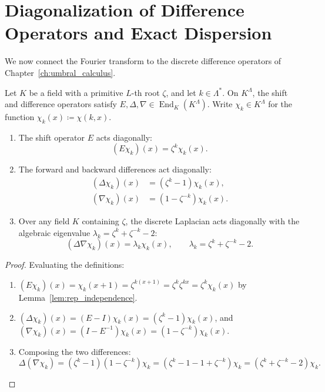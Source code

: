 \section{Diagonalization of Difference Operators and Exact Dispersion}

We now connect the Fourier transform to the discrete difference operators of Chapter~\ref{ch:umbral_calculus}.

\begin{theorem}
\label{thm:diagonal_dispersion}
Let $K$ be a field with a primitive $L$-th root $\zeta$, and let $k\in\Lambda^*$. On $K^\Lambda$, the shift and difference operators satisfy $E,\Delta,\nabla\in\operatorname{End}_K(K^\Lambda)$. Write $\chi_k\in K^\Lambda$ for the function $\chi_k(x)\coloneqq\chi(k,x)$.
\begin{enumerate}
    \item The shift operator $E$ acts diagonally:
    \begin{equation}
    (E \chi_k)(x) = \zeta^k \chi_k(x).
    \end{equation}
    \item The forward and backward differences act diagonally:
    \begin{align}
    (\Delta \chi_k)(x) &= (\zeta^k - 1) \chi_k(x), \\
    (\nabla \chi_k)(x) &= (1 - \zeta^{-k}) \chi_k(x).
    \end{align}
    \item Over any field $K$ containing $\zeta$, the discrete Laplacian acts diagonally with the algebraic eigenvalue $\lambda_k=\zeta^k+\zeta^{-k}-2$:
    \begin{equation}
    (\Delta\nabla \chi_k)(x)=\lambda_k\chi_k(x),\qquad \lambda_k=\zeta^k+\zeta^{-k}-2.
    \end{equation}
\end{enumerate}
\end{theorem}

\begin{proof}
Evaluating the definitions:
\begin{enumerate}
    \item $(E \chi_k)(x) = \chi_k(x+1) = \zeta^{k (x+1)} = \zeta^k \zeta^{k x} = \zeta^k \chi_k(x)$ by Lemma~\ref{lem:rep_independence}.
    \item $(\Delta \chi_k)(x) = (E - I)\chi_k(x) = (\zeta^k - 1)\chi_k(x)$, and $(\nabla \chi_k)(x) = (I - E^{-1})\chi_k(x) = (1 - \zeta^{-k})\chi_k(x)$.
    \item Composing the two differences:
    \begin{equation}
    \Delta(\nabla \chi_k) = (\zeta^k - 1)(1 - \zeta^{-k})\chi_k = (\zeta^k - 1 - 1 + \zeta^{-k})\chi_k = (\zeta^k + \zeta^{-k} - 2)\chi_k.
    \end{equation}
\end{enumerate}
\end{proof}

